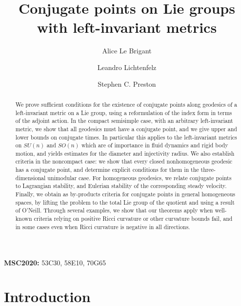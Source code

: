\documentclass[oneside, 11pt]{amsart}
\author[1]{Alice Le Brigant}
\author[2]{Leandro Lichtenfelz}
\author[3]{Stephen C. Preston}
\date{}
\numberwithin{equation}{section}
\begin{document}
 
\title{Conjugate points on Lie groups with left-invariant metrics}



\begin{abstract}
We prove sufficient conditions for the existence of conjugate points along geodesics of a left-invariant metric on a Lie group, using a reformulation of the index form in terms of the adjoint action. In the compact semisimple case, with an arbitrary left-invariant metric, we show that all geodesics must have a conjugate point, and we give upper and lower bounds on conjugate times. In particular this applies to the left-invariant metrics on $SU(n)$ and $SO(n)$ which are of importance in fluid dynamics and rigid body motion, and yields estimates for the diameter and injectivity radius. We also establish criteria in the noncompact case: we show that every closed nonhomogeneous geodesic has a conjugate point, and determine explicit conditions for them in the three-dimensional unimodular case. For homogeneous geodesics, we relate conjugate points to Lagrangian stability, and Eulerian stability of the corresponding steady velocity. Finally, we obtain as by-products criteria for conjugate points in general homogeneous spaces, by lifting the problem to the total Lie group of the quotient and using a result of O'Neill. Through several examples, we show that our theorems apply when well-known criteria relying on positive Ricci curvature or other curvature bounds fail, and in some cases even when Ricci curvature is negative in all directions. 
\end{abstract}

\maketitle 

 
\textbf{MSC2020:} 53C30, 58E10, 70G65
\setcounter{tocdepth}{1}

\tableofcontents










\section{Introduction}
\end{document}
